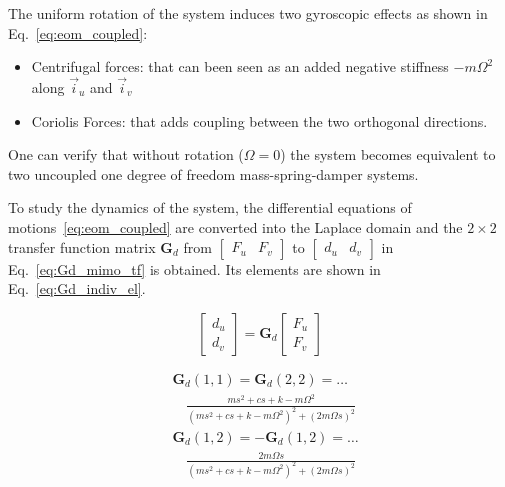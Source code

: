 \documentclass[10pt]{iopart}
\begin{document}
The uniform rotation of the system induces two gyroscopic effects as shown in Eq.~\eqref{eq:eom_coupled}:
\begin{itemize}
\item Centrifugal forces: that can been seen as an added negative stiffness \(- m \Omega^2\) along \(\vec{i}_u\) and \(\vec{i}_v\)
\item Coriolis Forces: that adds coupling between the two orthogonal directions.
\end{itemize}

One can verify that without rotation (\(\Omega = 0\)) the system becomes equivalent to two uncoupled one degree of freedom mass-spring-damper systems.

\par
To study the dynamics of the system, the differential equations of motions~\eqref{eq:eom_coupled} are converted into the Laplace domain and the \(2 \times 2\) transfer function matrix \(\mathbf{G}_d\) from \(\begin{bmatrix}F_u & F_v\end{bmatrix}\) to \(\begin{bmatrix}d_u & d_v\end{bmatrix}\) in Eq.~\eqref{eq:Gd_mimo_tf} is obtained.
Its elements are shown in Eq.~\eqref{eq:Gd_indiv_el}.

\begin{equation}
\label{eq:Gd_mimo_tf}
  \begin{bmatrix} d_u \\ d_v \end{bmatrix} = \mathbf{G}_d \begin{bmatrix} F_u \\ F_v \end{bmatrix}
\end{equation}


\begin{subequations}
\label{eq:Gd_indiv_el}
\begin{align}
  & \mathbf{G}_{d}(1,1) = \mathbf{G}_{d}(2,2) = \dots \nonumber \\
  & \quad {\frac{ms^2 + cs + k - m \Omega^2}{\left( m s^2 + cs + k - m \Omega^2 \right)^2 + \left( 2 m \Omega s \right)^2}} \\
  & \mathbf{G}_{d}(1,2) = -\mathbf{G}_{d}(1,2) = \dots \nonumber \\
  & \quad {\frac{2 m \Omega s}{\left( m s^2 + cs + k - m \Omega^2 \right)^2 + \left( 2 m \Omega s \right)^2}}
\end{align}
\end{subequations}
\end{document}

